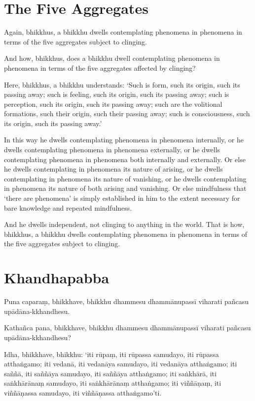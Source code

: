 
\englishPage
\section{The Five Aggregates}

Again, bhikkhus, a bhikkhu dwells contemplating phenomena in phenomena in terms
of the five aggregates subject to clinging.

And how, bhikkhus, does a bhikkhu dwell contemplating phenomena in phenomena in
terms of the five aggregates affected by clinging?

Here, bhikkhus, a bhikkhu understands:
`Such is form, such its origin, such its passing away;
such is feeling, such its origin, such its passing away;
such is perception, such its origin, such its passing away;
such are the volitional formations, such their origin, such their passing away;
such is consciousness, such its origin, such its passing away.'

In this way he dwells contemplating phenomena in phenomena internally, or he
dwells contemplating phenomena in phenomena externally, or he dwells
contemplating phenomena in phenomena both internally and externally. Or else he
dwells contemplating in phenomena its nature of arising, or he dwells
contemplating in phenomena its nature of vanishing, or he dwells contemplating
in phenomena its nature of both arising and vanishing. Or else mindfulness that
‘there are phenomena’ is simply established in him to the extent necessary for
bare knowledge and repeated mindfulness.

And he dwells independent, not clinging to anything in the world. That is how,
bhikkhus, a bhikkhu dwells contemplating phenomena in phenomena in terms of the
five aggregates subject to clinging.


\paliPage
\section*{Khandhapabba}

Puna caparaṃ, bhikkhave, bhikkhu dhammesu dhammānupassī viharati pañcasu
upādāna-kkhandhesu.

Kathañca pana, bhikkhave, bhikkhu dhammesu dhammānupassī viharati pañcasu
upādāna-kkhandhesu?

Idha, bhikkhave, bhikkhu:
‘iti rūpaṃ, iti rūpassa samudayo, iti rūpassa atthaṅgamo;
iti vedanā, iti vedanāya samudayo, iti vedanāya atthaṅgamo;
iti saññā, iti saññāya samudayo, iti saññāya atthaṅgamo;
iti saṅkhārā, iti saṅkhārānaṃ samudayo, iti saṅkhārānaṃ atthaṅgamo;
iti viññāṇaṃ, iti viññāṇassa samudayo, iti viññāṇassa atthaṅgamo’ti.


